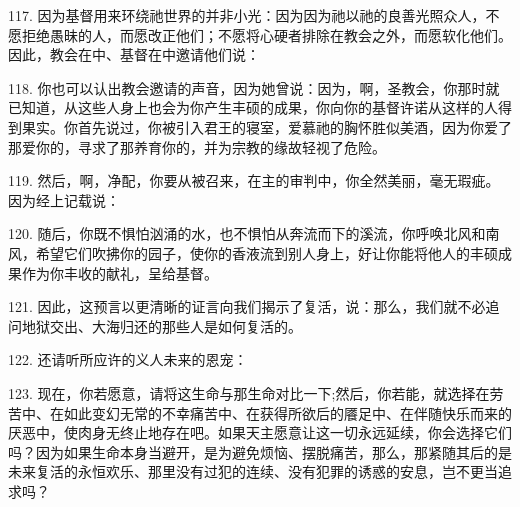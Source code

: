 117. 因为基督用来环绕祂世界的并非小光：因为因为祂以祂的良善光照众人，不愿拒绝愚昧的人，而愿改正他们；不愿将心硬者排除在教会之外，而愿软化他们。因此，教会在中、基督在中邀请他们说：\par

118. 你也可以认出教会邀请的声音，因为她曾说：因为，啊，圣教会，你那时就已知道，从这些人身上也会为你产生丰硕的成果，你向你的基督许诺从这样的人得到果实。你首先说过，你被引入君王的寝室，爱慕祂的胸怀胜似美酒，因为你爱了那爱你的，寻求了那养育你的，并为宗教的缘故轻视了危险。\par

119. 然后，啊，净配，你要从被召来，在主的审判中，你全然美丽，毫无瑕疵。因为经上记载说：\par

120. 随后，你既不惧怕汹涌的水，也不惧怕从奔流而下的溪流，你呼唤北风和南风，希望它们吹拂你的园子，使你的香液流到别人身上，好让你能将他人的丰硕成果作为你丰收的献礼，呈给基督。\par

121. 因此，这预言以更清晰的证言向我们揭示了复活，说：那么，我们就不必追问地狱交出、大海归还的那些人是如何复活的。\par

122. 还请听所应许的义人未来的恩宠：\par

123. 现在，你若愿意，请将这生命与那生命对比一下;然后，你若能，就选择在劳苦中、在如此变幻无常的不幸痛苦中、在获得所欲后的餍足中、在伴随快乐而来的厌恶中，使肉身无终止地存在吧。如果天主愿意让这一切永远延续，你会选择它们吗？因为如果生命本身当避开，是为避免烦恼、摆脱痛苦，那么，那紧随其后的是未来复活的永恒欢乐、那里没有过犯的连续、没有犯罪的诱惑的安息，岂不更当追求吗？\par

